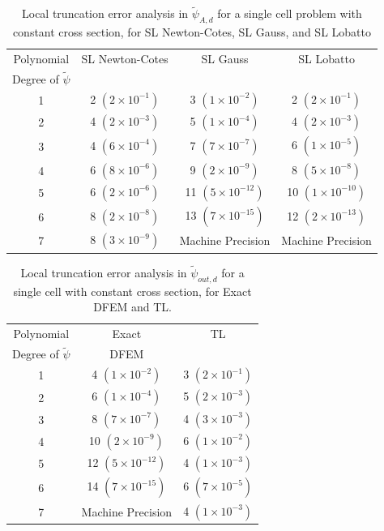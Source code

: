 \begin{table}[!hbp]
\centering
\caption{Local truncation error analysis in $\widetilde{\psi}_{A,d}$ for a single cell problem with constant cross section, for SL Newton-Cotes, SL Gauss, and SL Lobatto}
\begin{tabular}{|c|c|c|c|} 
\hline
  Polynomial 										 & SL Newton-Cotes 					& SL Gauss 			 						& SL Lobatto  \\
  Degree  of $\widetilde{\psi}$	  & {}		 							 			& {}   											&	 {}   \\
  	\hline
				1   									  &	2 $(2\times 10^{-1})$			&	3 $(1\times 10^{-2})$			&	2 $(2\times 10^{-1})$		\\
		\hline
				2   							     &	4 $(2\times 10^{-3})$			&	5 $(1\times 10^{-4})$			&	4 $(2\times 10^{-3})$		\\
		\hline	
				3   								  	&	4 $(6\times 10^{-4})$			&	 7 $(7\times 10^{-7})$		&	6 $(1\times 10^{-5})$\\
		\hline
				4   									  &	6 $(8\times 10^{-6})$			&	9 $(2\times 10^{-9})$			&	8 $(5\times 10^{-8})$	\\
		\hline
				5   								  	&	6 $(2\times 10^{-6})$			&	11 $(5\times 10^{-12})$		&	10 $(1\times 10^{-10})$\\
		\hline	
				6   								  	&	8 $(2\times 10^{-8})$			&	13 $(7\times 10^{-15})$		&	12 $(2\times 10^{-13})$\\
		\hline
				7   								  	&	8 $(3\times 10^{-9})$			&	Machine Precision					&	Machine Precision   \\
		\hline	
\end{tabular}
\label{tbl:taylor_avg_part2} 
\end{table}
%
\pagebreak
%
\begin{table}[!htp]
\centering
\caption{Local truncation error analysis in $\widetilde{\psi}_{out,d}$ for a single cell with constant cross section, for Exact DFEM and TL.}
\begin{tabular}{|c|c|c|} 
\hline
  Polynomial 										  & Exact 										& TL  	\\
  Degree  of $\widetilde{\psi}$		&   DFEM										& {}	\\
  	\hline
				1   											&  4 $(1\times 10^{-2})$		& 3 $(2\times 10^{-1})$	\\
		\hline
				2   											&  6 $(1\times 10^{-4})$		& 5 $(2\times 10^{-3})$	\\
		\hline	
				3   											&  8 $(7\times 10^{-7})$		& 4 $(3\times 10^{-3})$	\\
		\hline
				4   											&  10 $(2\times 10^{-9})$		& 6 $(1\times 10^{-2})$	\\
		\hline
				5   											&  12 $(5\times 10^{-12})$	& 4 $(1\times 10^{-3})$	\\
		\hline		
				6   											&  14 $(7\times 10^{-15})$	& 6 $(7\times 10^{-5})$	\\
		\hline
				7   											&  Machine Precision				& 4 $(1\times 10^{-3})$	\\
		\hline
\end{tabular}
\label{tbl:taylor_out_part1} 
\end{table}
